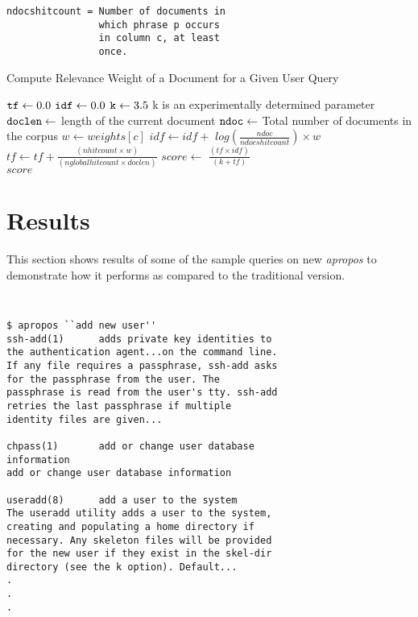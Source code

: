 \documentclass[letterpaper,twocolumn,10pt]{article}
\begin{document}
\begin{description}
{\begin{lstlisting}
ndocshitcount = Number of documents in
                which phrase p occurs
                in column c, at least
                once.
\end{lstlisting}
}
\begin{algorithm}
\caption{Compute Relevance Weight of a Document for a Given User Query}
\label{alg1}
\begin{algorithmic}[1]
\State ${\tt tf} \gets 0.0$
\State ${\tt idf} \gets 0.0$
\State ${\tt k} \gets 3.5$
\Comment 
{k is an experimentally determined parameter}
\State ${\tt doclen} \gets $ length of the current document
\State ${\tt ndoc} \gets $ Total number of documents in the corpus
\State $w \gets weights[c] $
\State $idf \gets idf + $ $log(\frac{ndoc}{ndocshitcount})\times w $
\State $tf \gets tf + \frac{(nhitcount \times w)}{(nglobalhitcount \times doclen)}$
\EndFor
\EndFor
\State $score \gets $ $\frac{(tf \times idf)}{(k + tf)}$ \\
\Return $score$
\end{algorithmic}
\end{algorithm}
\end{description}

\section{Results}
This section shows results of some of the sample queries on new \textit{apropos}
to demonstrate how it performs as compared to the traditional version. \\

{\tt \small
{}
\begin{lstlisting}
$ apropos ``add new user''
ssh-add(1)      adds private key identities to
the authentication agent...on the command line.
If any file requires a passphrase, ssh-add asks
for the passphrase from the user. The
passphrase is read from the user's tty. ssh-add
retries the last passphrase if multiple
identity files are given...

chpass(1)       add or change user database
information
add or change user database information

useradd(8)      add a user to the system
The useradd utility adds a user to the system,
creating and populating a home directory if
necessary. Any skeleton files will be provided
for the new user if they exist in the skel-dir
directory (see the k option). Default...
.
.
.
\end{lstlisting}
}
\end{document}
